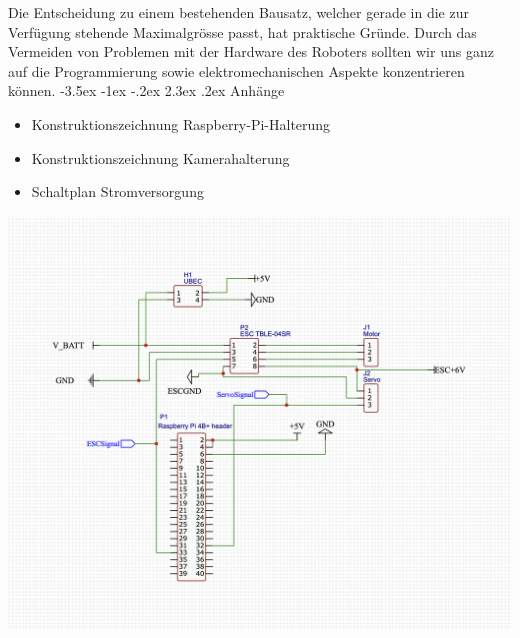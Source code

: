 \documentclass[a4paper]{scrarticle}
\makeatletter
\renewcommand\section{\@startsection {section}{1}{\z@}%
                                   {-3.5ex \@plus -1ex \@minus -.2ex}%
                                   {2.3ex \@plus.2ex}%
                                   {\Huge\AKAfont}}
\makeatother
\begin{document}
Die Entscheidung zu einem bestehenden Bausatz, welcher gerade in die zur Verfügung stehende Maximalgrösse passt, hat praktische Gründe. Durch das Vermeiden von Problemen mit der Hardware des Roboters sollten wir uns ganz auf die Programmierung sowie elektromechanischen Aspekte konzentrieren können.
\section{Anhänge}

\begin{itemize}
	\item Konstruktionszeichnung Raspberry-Pi-Halterung
	\item Konstruktionszeichnung Kamerahalterung
	\item Schaltplan Stromversorgung
\end{itemize}




\includegraphics[width=16cm]{circuit.png}
\end{document}
